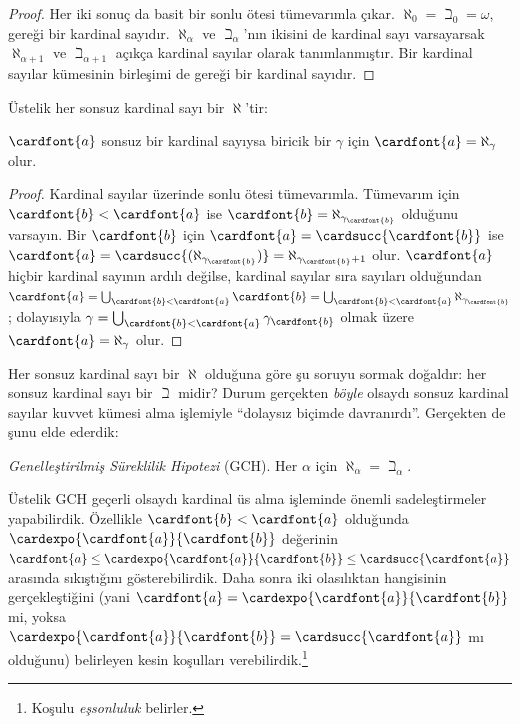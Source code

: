 \documentclass[../../../include/open-logic-section]{subfiles}
\begin{document}
\begin{proof}
Her iki sonuç da basit bir sonlu ötesi tümevarımla çıkar.
$\aleph_0=\beth_0=\omega$, 
gereği bir kardinal sayıdır. $\aleph_\alpha$ ve $\beth_\alpha$'nın
ikisini de kardinal sayı varsayarsak $\aleph_{\alpha+1}$ ve
$\beth_{\alpha+1}$ açıkça kardinal sayılar olarak tanımlanmıştır. Bir
kardinal sayılar kümesinin birleşimi de
 gereği bir kardinal
sayıdır.
\end{proof}
\noindent
Üstelik her sonsuz kardinal sayı bir $\aleph$'tir:

\begin{prop}
$\cardfont{a}$ sonsuz bir kardinal sayıysa biricik bir $\gamma$ için
$\cardfont{a}=\aleph_\gamma$ olur.
\end{prop}

\begin{proof}
Kardinal sayılar üzerinde sonlu ötesi tümevarımla. Tümevarım için
$\cardfont{b}<\cardfont{a}$ ise
$\cardfont{b}=\aleph_{\gamma_\cardfont{b}}$ olduğunu varsayın.
Bir $\cardfont{b}$ için
$\cardfont{a}=\cardsucc{\cardfont{b}}$ ise
$\cardfont{a}=\cardsucc{(\aleph_{\gamma_\cardfont{b}})}=
\aleph_{\gamma_\cardfont{b}+1}$ olur. $\cardfont{a}$ hiçbir kardinal
sayının ardılı değilse, kardinal sayılar sıra sayıları olduğundan
$\cardfont{a}=\bigcup_{\cardfont{b}<\cardfont{a}}\cardfont{b}=
\bigcup_{\cardfont{b}<\cardfont{a}}{\aleph_{\gamma_\cardfont{b}}}$;
dolayısıyla
$\gamma=\bigcup_{\cardfont{b}<\cardfont{a}}\gamma_\cardfont{b}$ olmak
üzere $\cardfont{a}=\aleph_\gamma$ olur.
\end{proof}

Her sonsuz kardinal sayı bir $\aleph$ olduğuna göre şu soruyu sormak
doğaldır: her sonsuz kardinal sayı bir $\beth$ midir? Durum gerçekten
\emph{böyle} olsaydı sonsuz kardinal sayılar kuvvet kümesi alma işlemiyle
``dolaysız biçimde davranırdı''. Gerçekten de şunu elde ederdik:

\begin{defish}
\emph{Genelleştirilmiş Süreklilik Hipotezi} (GCH).
Her $\alpha$ için $\aleph_\alpha=\beth_\alpha$.
\end{defish}

Üstelik GCH geçerli olsaydı kardinal üs alma işleminde önemli
sadeleştirmeler yapabilirdik. Özellikle $\cardfont{b}<\cardfont{a}$
olduğunda $\cardexpo{\cardfont{a}}{\cardfont{b}}$ değerinin
$\cardfont{a}\leq\cardexpo{\cardfont{a}}{\cardfont{b}}\leq
\cardsucc{\cardfont{a}}$ arasında sıkıştığını gösterebilirdik. Daha sonra
iki olasılıktan hangisinin gerçekleştiğini (yani
$\cardfont{a}=\cardexpo{\cardfont{a}}{\cardfont{b}}$ mi, yoksa
$\cardexpo{\cardfont{a}}{\cardfont{b}}=\cardsucc{\cardfont{a}}$ mı
olduğunu) belirleyen kesin koşulları verebilirdik.\footnote{Koşulu
\emph{eşsonluluk} belirler.}
\end{document}
